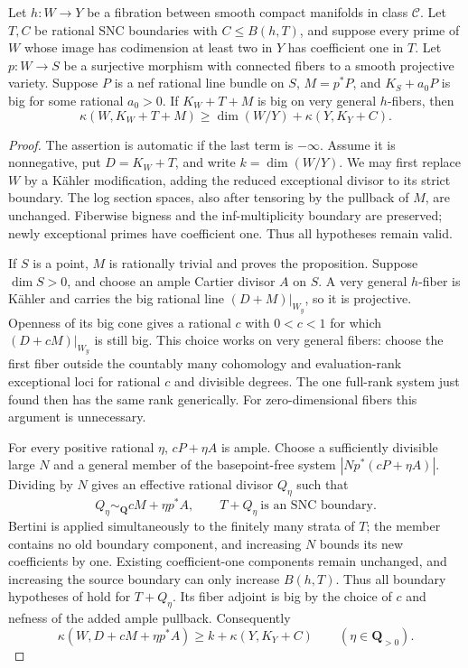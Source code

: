 \begin{proposition}
\label{addition:principle}
Let $h:W\to Y$ be a fibration between smooth compact manifolds in
class $\mathcal C$. Let $T,C$ be rational SNC boundaries with
$C\leq B(h,T)$, and suppose every prime of $W$ whose image has
codimension at least two in $Y$ has coefficient one in $T$.
Let $p:W\to S$ be a surjective morphism with connected fibers to
a smooth projective variety. Suppose $P$ is a nef rational line
bundle on $S$, $M=p^*P$, and $K_S+a_0P$ is big for some rational
$a_0>0$. If $K_W+T+M$ is big on very general $h$-fibers, then
\[
 \kappa(W,K_W+T+M)
 \geq\dim(W/Y)+\kappa(Y,K_Y+C).
\]
\end{proposition}

\begin{proof}
The assertion is automatic if the last term is $-\infty$.
Assume it is nonnegative, put $D=K_W+T$, and write
$k=\dim(W/Y)$. We may first replace $W$ by a K\"ahler
modification, adding the reduced exceptional divisor to its strict
boundary. The log section spaces, also after tensoring by the
pullback of $M$, are unchanged. Fiberwise bigness and the
inf-multiplicity boundary are preserved; newly exceptional primes
have coefficient one. Thus all hypotheses remain valid.

If $S$ is a point, $M$ is rationally trivial and
 proves the proposition. Suppose $\dim S>0$,
and choose an ample Cartier divisor $A$ on $S$. A very general
$h$-fiber is K\"ahler and carries the big rational line
$(D+M)|_{W_y}$, so it is projective. Openness of its big cone
gives a rational $c$ with $0<c<1$ for which
$(D+cM)|_{W_y}$ is still big. This choice works on very general
fibers: choose the first fiber outside the countably many
cohomology and evaluation-rank exceptional loci for rational $c$
and divisible degrees. The one full-rank system just found then
has the same rank generically. For zero-dimensional fibers this
argument is unnecessary.

For every positive rational $\eta$, $cP+\eta A$ is ample.
Choose a sufficiently divisible large $N$ and a general member
of the basepoint-free system $|Np^*(cP+\eta A)|$. Dividing by
$N$ gives an effective rational divisor $Q_\eta$ such that
\[
 Q_\eta\sim_{\mathbf Q}cM+\eta p^*A,
 \qquad T+Q_\eta\ \text{is an SNC boundary}.
\]
Bertini is applied simultaneously to the finitely many strata of
$T$; the member contains no old boundary component, and increasing
$N$ bounds its new coefficients by one. Existing coefficient-one
components remain unchanged, and increasing the source boundary
can only increase $B(h,T)$. Thus all boundary hypotheses of
 hold for $T+Q_\eta$. Its fiber adjoint is big
by the choice of $c$ and nefness of the added ample pullback.
Consequently
\begin{equation}\label{application:perturbed-bound}
 \kappa(W,D+cM+\eta p^*A)
       \geq k+\kappa(Y,K_Y+C)
       \qquad(\eta\in\mathbf Q_{>0}).
\end{equation}


\end{proof}
